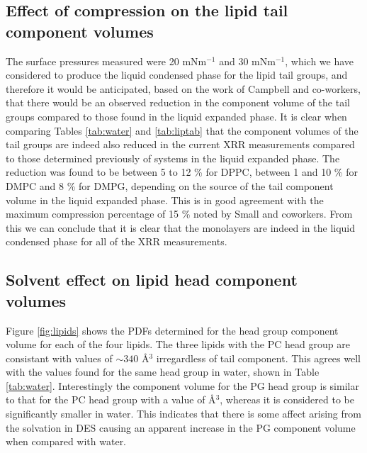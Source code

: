 \documentclass[twoside,twocolumn,9pt]{article}
\begin{document}
\subsection{Effect of compression on the lipid tail component volumes}
The surface pressures measured were 20 mNm$^{-1}$ and 30 mNm$^{-1}$, which we have considered to produce the liquid condensed phase for the lipid tail groups, and therefore it would be anticipated, based on the work of Campbell and co-workers,\cite{Campbell2018} that there would be an observed reduction in the component volume of the tail groups compared to those found in the liquid expanded phase. It is clear when comparing Tables \ref{tab:water} and \ref{tab:liptab} that the component volumes of the tail groups are indeed also reduced in the current XRR measurements compared to those determined previously of systems in the liquid expanded phase. The reduction was found to be between 5 to 12 \% for DPPC, between 1 and 10 \% for DMPC and 8 \% for DMPG, depending on the source of the tail component volume in the liquid expanded phase. This is in good agreement with the maximum compression percentage of 15 \% noted by Small and coworkers.\cite{Small1984} From this we can conclude that it is clear that the monolayers are indeed in the liquid condensed phase for all of the XRR measurements. 

\subsection{Solvent effect on lipid head component volumes}
Figure \ref{fig:lipids} shows the PDFs determined for the head group component volume for each of the four lipids. The three lipids with the PC head group are consistant with values of $\sim340$ \AA$^3$ irregardless of tail component. This agrees well with the values found for the same head group in water, shown in Table \ref{tab:water}. Interestingly the component volume for the PG head group is similar to that for the PC head group with a value of \AA$^3$, whereas it is considered to be significantly smaller in water. This indicates that there is some affect arising from the solvation in DES causing an apparent increase in the PG component volume when compared with water. 
\end{document}
